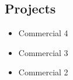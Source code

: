 \subsection{Projects}

\begin{itemize}
    \item Commercial 4
    \item Commercial 3
    \item Commercial 2
\end{itemize}

\newpage

